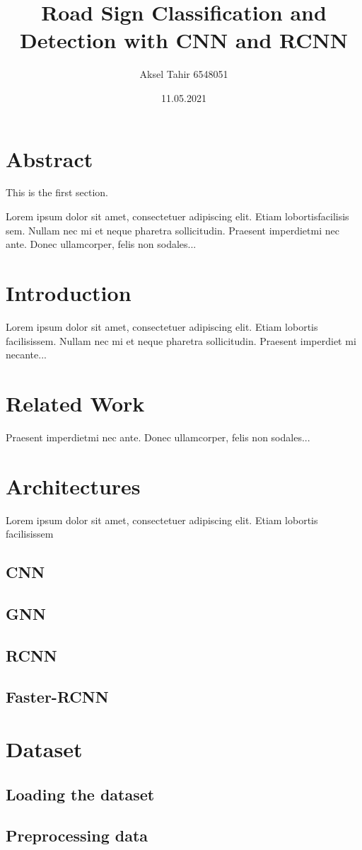 \documentclass[12pt]{article}
\title{Road Sign Classification and Detection with CNN and RCNN}
\author{Aksel Tahir 6548051}
\date{11.05.2021}
\begin{document}
\maketitle
\tableofcontents

\section{Abstract}
This is the first section.

Lorem  ipsum  dolor  sit  amet,  consectetuer  adipiscing  
elit.   Etiam  lobortisfacilisis sem.  Nullam nec mi et 
neque pharetra sollicitudin.  Praesent imperdietmi nec ante. 
Donec ullamcorper, felis non sodales...

\section{Introduction}

Lorem ipsum dolor sit amet, consectetuer adipiscing elit.  
Etiam lobortis facilisissem.  Nullam nec mi et neque pharetra 
sollicitudin.  Praesent imperdiet mi necante...

\section{Related Work}
Praesent imperdietmi nec ante. Donec ullamcorper, felis non sodales...

\section{Architectures}
Lorem ipsum dolor sit amet, consectetuer adipiscing elit.  
Etiam lobortis facilisissem

\subsection{CNN}
\subsection{GNN}
\subsection{RCNN}
\subsection{Faster-RCNN}
    
\section{Dataset}
\subsection{Loading the dataset}
\subsection{Preprocessing data}
\end{document}
